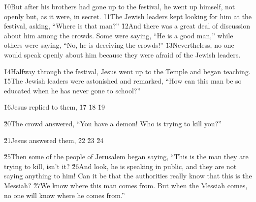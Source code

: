 \v{10}But after his brothers had gone up to the festival, he went up himself, not openly but, as it were, in secret. \v{11}The Jewish leaders kept looking for him at the festival, asking, ``Where is that man?'' \v{12}And there was a great deal of discussion about him among the crowds. Some were saying, ``He is a good man,'' while others were saying, ``No, he is deceiving the crowds!'' \v{13}Nevertheless, no one would speak openly about him because they were afraid of the Jewish leaders.

\v{14}Halfway through the festival, Jesus went up to the Temple and began teaching. \v{15}The Jewish leaders were astonished and remarked, ``How can this man be so educated when he has never gone to school?''

\v{16}Jesus replied to them,  \v{17} \v{18} \v{19}

\v{20}The crowd answered, ``You have a demon! Who is trying to kill you?''

\v{21}Jesus answered them,  \v{22} \v{23} \v{24}

\v{25}Then some of the people of Jerusalem began saying, ``This is the man they are trying to kill, isn't it? \v{26}And look, he is speaking in public, and they are not saying anything to him! Can it be that the authorities really know that this is the Messiah? \v{27}We know where this man comes from. But when the Messiah comes, no one will know where he comes from.''

